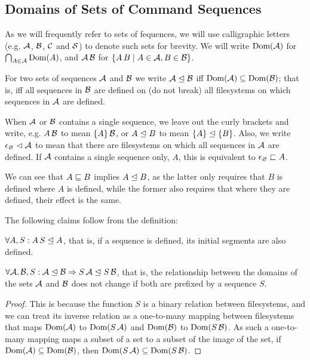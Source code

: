 

\subsection{Domains of Sets of Command Sequences}

\begin{mydef}
As we will frequently refer to sets of fequences,
we will use calligraphic letters (e.g. $\mathcal{A}$, $\mathcal{B}$, $\mathcal{C}$ and $\mathcal{S}$)
to denote such sets for brevity.
We will write $\textrm{Dom}({\mathcal{A}})$ for $\bigcap_{A\in\mathcal{A}} \textrm{Dom}({A})$,
and $\mathcal{A}\,\mathcal{B}$ for $\{A\, B\mathrel{|} A\in\mathcal{A}, B\in\mathcal{B}\}$.
\end{mydef}


\begin{mydef}[$\worksmeqsign$]
For two sets of sequences $\mathcal{A}$ and $\mathcal{B}$
we write ${\mathcal{A}}\trianglelefteq{\mathcal{B}}$ iff $\textrm{Dom}({\mathcal{A}}) \subseteq \textrm{Dom}({\mathcal{B}})$;
that is, iff all sequences in $\mathcal{B}$ are defined on (do not break)
all filesystems on which sequences in $\mathcal{A}$ are defined.
\end{mydef}

When $\mathcal{A}$ or $\mathcal{B}$ contains a single sequence,
we leave out the curly brackets and write,
e.g. $A\,\mathcal{B}$ to mean $\{A\}\,\mathcal{B}$,
or ${A}\trianglelefteq{B}$ to mean ${\{{A}\}}\trianglelefteq{\{{B}\}}$.
Also, we write ${\epsilon_\varnothing}\vartriangleleft{\mathcal{A}}$ to mean that
there are filesystems on which all sequences in $\mathcal{A}$ are defined.
If $\mathcal{A}$ contains a single sequence only, $A$, this is equivalent to $\epsilon_\varnothing\sqsubset{A}$.

We can see that $A\sqsubseteq B$ implies ${A}\trianglelefteq{B}$, as the latter
only requires that $B$ is defined where $A$ is defined, 
while the former also requires
that where they are defined, their effect is the same.

The following claims follow from the definition:

\begin{myclm}
$\forall A,S: {A\, S}\trianglelefteq{A}$, that is, if a sequence is defined,
its initial segments are also defined.
\end{myclm}

\begin{myclm}
$\forall \mathcal{A},\mathcal{B},S: {\mathcal{A}}\trianglelefteq{\mathcal{B}} \Rightarrow {S\,\mathcal{A}}\trianglelefteq{S\,\mathcal{B}}$,
that is,
the relationship between the domains of the sets $\mathcal{A}$ and $\mathcal{B}$ 
does not change if both are prefixed by a sequence $S$.
\end{myclm}
\begin{proof}
This is because the function $S$ is a binary relation between filesystems,
and we can treat its inverse relation as a one-to-many mapping between filesystems
that maps $\textrm{Dom}({\mathcal{A}})$ to $\textrm{Dom}({S\,\mathcal{A}})$ and $\textrm{Dom}({\mathcal{B}})$ to $\textrm{Dom}({S\,\mathcal{B}})$.
As such a one-to-many mapping maps a subset of a set to a subset of the image of the set,
if $\textrm{Dom}({\mathcal{A}})\subseteq\textrm{Dom}({\mathcal{B}})$, then $\textrm{Dom}({S\,\mathcal{A}})\subseteq\textrm{Dom}({S\,\mathcal{B}})$.
\end{proof}

